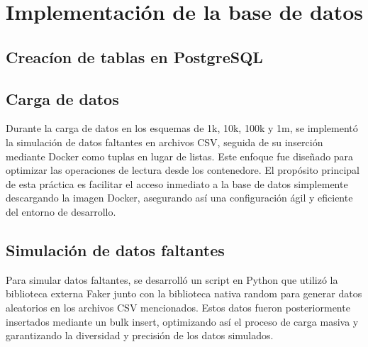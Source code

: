 \section{Implementación de la base de datos}
\subsection{Creacíon de tablas en PostgreSQL}{}
{}

\subsection{Carga de datos} {Durante la carga de datos en los esquemas de 1k, 10k, 100k y 1m, se implementó la simulación de datos faltantes en archivos CSV, seguida de su inserción mediante Docker como tuplas en lugar de listas. Este enfoque fue diseñado para optimizar las operaciones de lectura desde los contenedore. El propósito principal de esta práctica es facilitar el acceso inmediato a la base de datos simplemente descargando la imagen Docker, asegurando así una configuración ágil y eficiente del entorno de desarrollo.}
\subsection{Simulación de datos faltantes} {Para simular datos faltantes, se desarrolló un script en Python que utilizó la biblioteca externa Faker junto con la biblioteca nativa random para generar datos aleatorios en los archivos CSV mencionados. Estos datos fueron posteriormente insertados mediante un bulk insert, optimizando así el proceso de carga masiva y garantizando la diversidad y precisión de los datos simulados.}